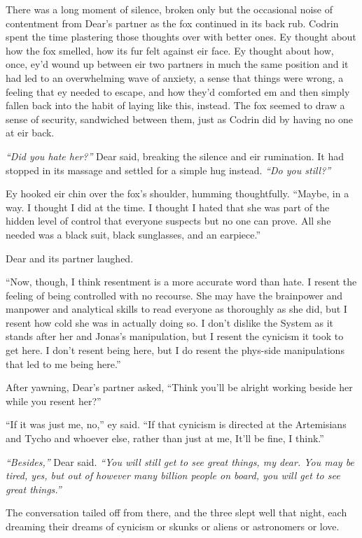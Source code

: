 There was a long moment of silence, broken only but the occasional noise of contentment from Dear's partner as the fox continued in its back rub. Codrin spent the time plastering those thoughts over with better ones. Ey thought about how the fox smelled, how its fur felt against eir face. Ey thought about how, once, ey'd wound up between eir two partners in much the same position and it had led to an overwhelming wave of anxiety, a sense that things were wrong, a feeling that ey needed to escape, and how they'd comforted em and then simply fallen back into the habit of laying like this, instead. The fox seemed to draw a sense of security, sandwiched between them, just as Codrin did by having no one at eir back.

\emph{``Did you hate her?''} Dear said, breaking the silence and eir rumination. It had stopped in its massage and settled for a simple hug instead. \emph{``Do you still?''}

Ey hooked eir chin over the fox's shoulder, humming thoughtfully. ``Maybe, in a way. I thought I did at the time. I thought I hated that she was part of the hidden level of control that everyone suspects but no one can prove. All she needed was a black suit, black sunglasses, and an earpiece.''

Dear and its partner laughed.

``Now, though, I think resentment is a more accurate word than hate. I resent the feeling of being controlled with no recourse. She may have the brainpower and manpower and analytical skills to read everyone as thoroughly as she did, but I resent how cold she was in actually doing so. I don't dislike the System as it stands after her and Jonas's manipulation, but I resent the cynicism it took to get here. I don't resent being here, but I do resent the phys-side manipulations that led to me being here.''

After yawning, Dear's partner asked, ``Think you'll be alright working beside her while you resent her?''

``If it was just me, no,'' ey said. ``If that cynicism is directed at the Artemisians and Tycho and whoever else, rather than just at me, It'll be fine, I think.''

\emph{``Besides,''} Dear said. \emph{``You will still get to see great things, my dear. You may be tired, yes, but out of however many billion people on board, you will get to see great things.''}

The conversation tailed off from there, and the three slept well that night, each dreaming their dreams of cynicism or skunks or aliens or astronomers or love.

